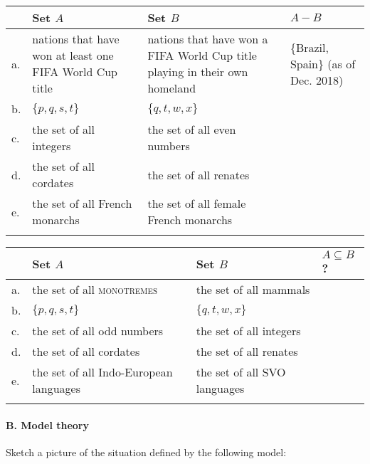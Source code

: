 {\noindent
\begin{tabularx}{\textwidth}{lQQQ}
\lsptoprule
 & Set $A$ & Set $B$ & $A-B$\\
 \midrule
a. & nations that have won at least one FIFA World Cup title & nations that have won a FIFA World Cup title playing in their own homeland
& \{Brazil, Spain\} (as of Dec. 2018) \\
\tablevspace
b. & $\{p,q,s,t\}$ & $\{q,t,w,x\}$ & \\
\tablevspace
c. & the set of all integers & the set of all even numbers & \\
\tablevspace
d. & the set of all cordates & the set of all renates & \\
\tablevspace
e. & the set of all {French} monarchs & the set of all female {French} monarchs & \\
\lspbottomrule
\end{tabularx}
\bigskip 

\noindent
\begin{tabularx}{\textwidth}{lQQl}
\lsptoprule
&  Set $A$ & Set $B$ & $A \subseteq B$?\\
\midrule
a. & the set of all \textsc{monotremes} &  the set of all mammals & \\
\tablevspace

b. & $\{p,q,s,t\}$ & $\{q,t,w,x\}$ & \\
\tablevspace

c. & the set of all odd numbers & the set of all integers & \\
\tablevspace

d. & the set of all cordates & the set of all renates & \\
\tablevspace

e. & the set of all Indo-European  languages & the set of all SVO languages & \\
\lspbottomrule
\end{tabularx}

\bigskip


\paragraph*{B. Model theory}
\ea Sketch a picture of the situation defined by the following model:


}
